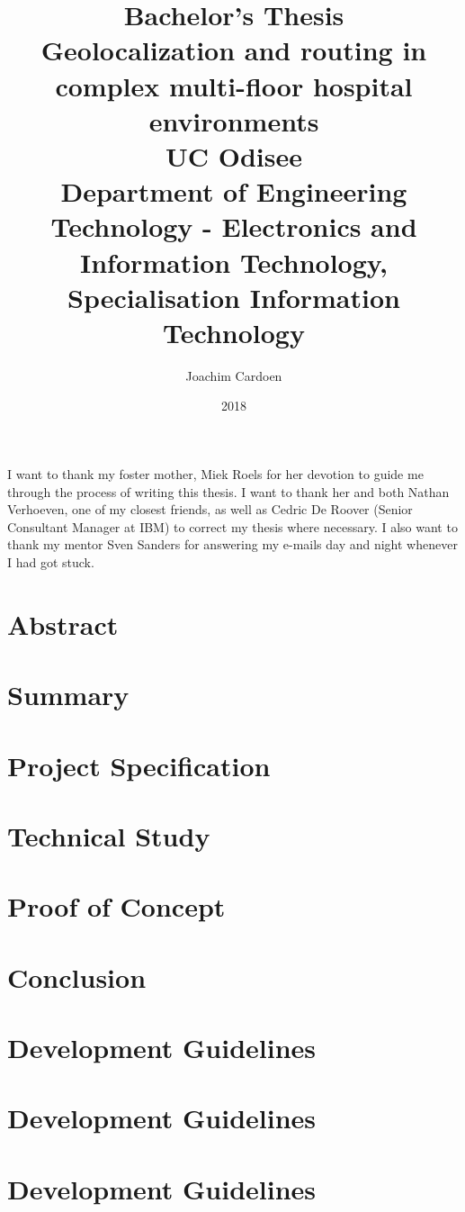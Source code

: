 \documentclass[11pt,twoside]{report}
\title{
    {\large Bachelor's Thesis}\\
    {Geolocalization and routing in complex multi-floor hospital environments}\\
    {\large UC Odisee}\\
    {\large Department of Engineering Technology - Electronics and Information Technology, Specialisation Information Technology}
}
\author{Joachim Cardoen}
\date{2018}
\begin{document}
\begin{titlepage}
\maketitle
\end{titlepage}
\begin{center}
I want to thank my foster mother, Miek Roels for her devotion to guide me through the process of writing this thesis. I want to thank her and both Nathan Verhoeven, one of my closest friends, as well as Cedric De Roover (Senior Consultant Manager at IBM) to correct my thesis where necessary. I also want to thank my mentor Sven Sanders for answering my e-mails day and night whenever I had got stuck.
\end{center}
\chapter*{Abstract}

\tableofcontents
\clearpage
\printglossary[type=\acronymtype]
\printglossary
\chapter{Summary}
\chapter{Project Specification}

\chapter{Technical Study}

\chapter{Proof of Concept}


\chapter{Conclusion}


\appendix
\chapter{Development Guidelines}

\chapter{Development Guidelines}

\chapter{Development Guidelines}


\newpage
\printbibliography
\end{document}
